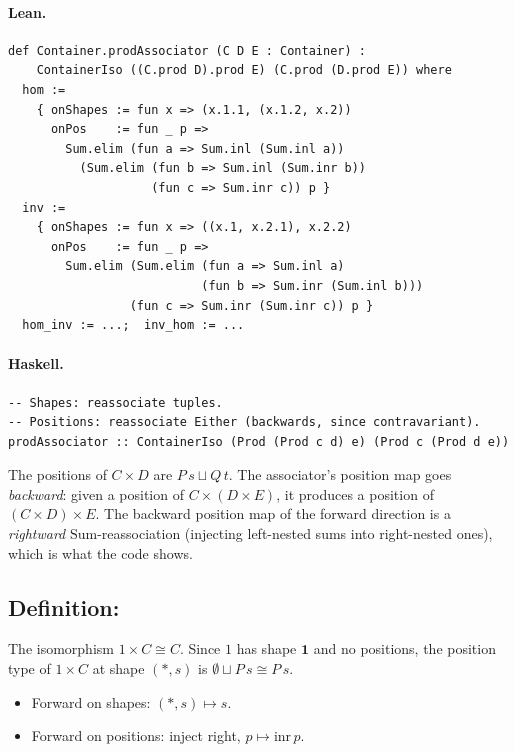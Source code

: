 \documentclass[11pt,a4paper]{article}
\begin{document}
\paragraph{Lean.}
\begin{lstlisting}[style=lean]
def Container.prodAssociator (C D E : Container) :
    ContainerIso ((C.prod D).prod E) (C.prod (D.prod E)) where
  hom :=
    { onShapes := fun x => (x.1.1, (x.1.2, x.2))
      onPos    := fun _ p =>
        Sum.elim (fun a => Sum.inl (Sum.inl a))
          (Sum.elim (fun b => Sum.inl (Sum.inr b))
                    (fun c => Sum.inr c)) p }
  inv :=
    { onShapes := fun x => ((x.1, x.2.1), x.2.2)
      onPos    := fun _ p =>
        Sum.elim (Sum.elim (fun a => Sum.inl a)
                           (fun b => Sum.inr (Sum.inl b)))
                 (fun c => Sum.inr (Sum.inr c)) p }
  hom_inv := ...;  inv_hom := ...
\end{lstlisting}

\paragraph{Haskell.}
\begin{lstlisting}[style=haskell]
-- Shapes: reassociate tuples.
-- Positions: reassociate Either (backwards, since contravariant).
prodAssociator :: ContainerIso (Prod (Prod c d) e) (Prod c (Prod d e))
\end{lstlisting}

\begin{fidelitynote}
The positions of $C \times D$ are $P\,s \sqcup Q\,t$.  The associator's position
map goes \emph{backward}: given a position of $C \times (D \times E)$, it
produces a position of $(C \times D) \times E$.  The backward position map of
the forward direction is a \emph{rightward} $\mathrm{Sum}$-reassociation
(injecting left-nested sums into right-nested ones), which is what the code
shows.
\end{fidelitynote}


\subsection{Definition: }

\begin{defn}
The isomorphism $1 \times C \cong C$.  Since $1$ has shape $\mathbf{1}$ and no
positions, the position type of $1 \times C$ at shape $(\ast, s)$ is
$\emptyset \sqcup P\,s \cong P\,s$.
\begin{itemize}
  \item Forward on shapes: $(\ast, s) \mapsto s$.
  \item Forward on positions: inject right, $p \mapsto \mathrm{inr}\,p$.
\end{itemize}
\end{defn}
\end{document}
